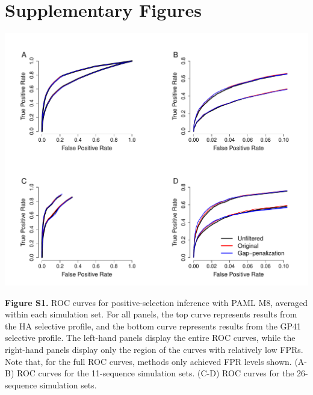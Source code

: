 \documentclass[11pt]{article}
\begin{document}
\newpage
\section{Supplementary Figures}


\centerline{\includegraphics[width=6.5in]{Figures/ROC_SI_paml.pdf}}
\noindent \textbf{Figure S1.} ROC curves for positive-selection inference with PAML M8, averaged within each simulation set. For all panels, the top curve represents results from the HA selective profile, and the bottom curve represents results from the GP41 selective profile. The left-hand panels display the entire ROC curves, while the right-hand panels display only the region of the curves with relatively low FPRs. Note that, for the full ROC curves, methods only achieved FPR levels shown. (A-B) ROC curves for the 11-sequence simulation sets. (C-D) ROC curves for the 26-sequence simulation sets.
\end{document}
